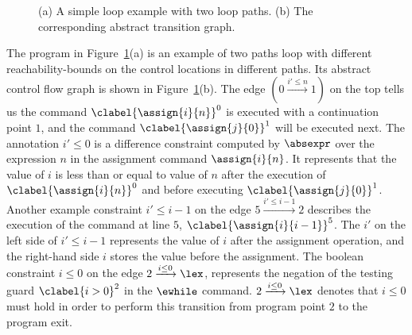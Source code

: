 \begin{example}
{\begin{figure}
\begin{subfigure}{.5\textwidth}
\begin{centering}
\begin{tikzpicture}[scale=\textwidth/20cm,samples=200]
  \end{tikzpicture}
  \caption{}
    \end{centering}
    \end{subfigure}
  \caption{
  (a) A simple loop example with two loop paths.
    (b) The corresponding abstract transition graph.}
      \label{fig:twoPathsWhile_abscfg}
  \end{figure}
  }
The program in Figure~\ref{fig:twoPathsWhile_abscfg}(a) is an example of two paths loop with different reachability-bounds on the control
locations in different paths.
Its abstract control flow graph is shown in Figure~\ref{fig:twoPathsWhile_abscfg}(b).
The edge $(0 \xrightarrow{i' \leq n} 1)$ on the top tells us the command 
$\clabel{\assign{i}{n}}^0$ is executed with a continuation point $1$, and the
command $\clabel{\assign{j}{0}}^1$ will be executed next.
The annotation $i' \leq 0$ is a difference constraint 
computed by $\absexpr$ over
the expression $n$ in the assignment command $\assign{i}{n}$.
It represents that the value of $i$ is less than or equal to value of $n$ after the
execution of $\clabel{\assign{i}{n}}^0$ and before executing $\clabel{\assign{j}{0}}^1$.
Another example constraint $i' \leq i - 1$ on the edge $5 \xrightarrow{i' \leq i - 1} 2$
describes the execution of
 the command at line $5$, 
$\clabel{\assign{i}{i - 1}}^{5}$. 
The $i'$ on the left side of $i' \leq i - 1$ represents the value of $i$ after the assignment operation,
and the right-hand side $i$ stores the value before the assignment.
The boolean constraint $i \leq 0 $ on the edge $2 \xrightarrow{i \leq 0} \lex$, 
represents the negation of the testing guard $\clabel{i > 0}^2$
in the $\ewhile$ command.
$2 \xrightarrow{i \leq 0} \lex$ denotes that $i \leq 0$ must hold in order to perform this transition from program point $2$ to
the program exit. 
\end{example}